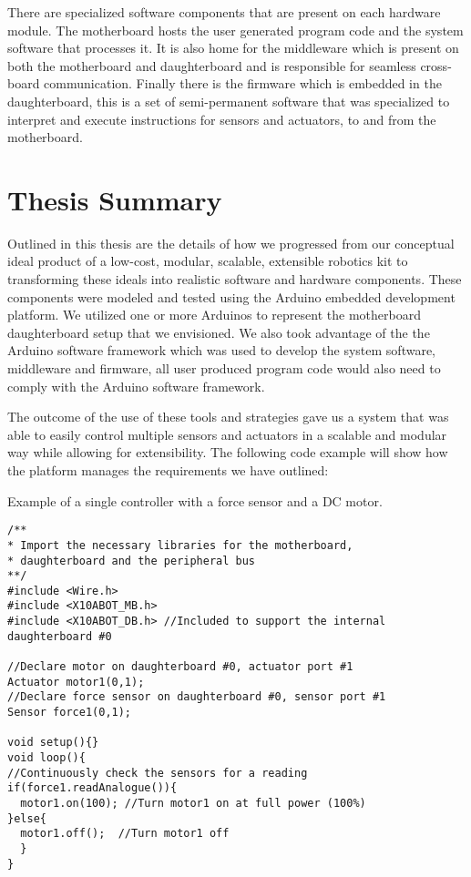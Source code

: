 There are specialized software components that are present on each hardware module. The motherboard hosts the user generated program code and the system software that processes it. It is also home for the middleware which is present on both the motherboard and daughterboard and is responsible for seamless cross-board communication. Finally there is the firmware which is embedded in the daughterboard, this is a set of semi-permanent software that was specialized to interpret and execute instructions for sensors and actuators, to and from the motherboard.

\section{Thesis Summary}
Outlined in this thesis are the details of how we progressed from our conceptual ideal product of a low-cost, modular, scalable, extensible robotics kit to transforming these ideals into realistic software and hardware components. These components were modeled and tested using the Arduino embedded development platform. We utilized one or more Arduinos to represent the motherboard daughterboard setup that we envisioned. We also took advantage of the the Arduino software framework which was used to develop the system software, middleware and firmware, all user produced program code would also need to comply with the Arduino software framework.

The outcome of the use of these tools and strategies gave us a system that was able to easily control multiple sensors and actuators in a scalable and modular way while allowing for extensibility.
The following code example will show how the \xten platform manages the requirements we have outlined:

\begin{listing}[H]
		\footnotesize
		\caption{Example of a single controller with a force sensor and a DC motor.} \label{code:simpl}
		\begin{verbatim}
/**
* Import the necessary libraries for the motherboard, 
* daughterboard and the peripheral bus
**/
#include <Wire.h>  
#include <X10ABOT_MB.h>
#include <X10ABOT_DB.h> //Included to support the internal daughterboard #0

//Declare motor on daughterboard #0, actuator port #1
Actuator motor1(0,1);
//Declare force sensor on daughterboard #0, sensor port #1
Sensor force1(0,1);

void setup(){}
void loop(){
//Continuously check the sensors for a reading
if(force1.readAnalogue()){
  motor1.on(100); //Turn motor1 on at full power (100%) 
}else{
  motor1.off();  //Turn motor1 off
  }
}	 
	\end{verbatim}
		
\end{listing}


